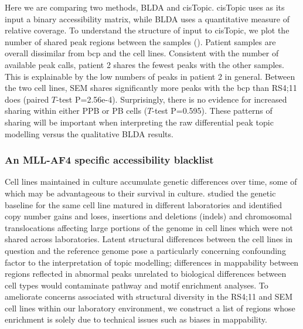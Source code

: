 Here we are comparing two methods, BLDA and cisTopic. cisTopic uses as its input a binary accessibility matrix, while BLDA uses a quantitative measure of relative coverage. To understand the structure of input to cisTopic, we plot the number of shared peak regions between the samples (). Patient samples are overall dissimilar from \gls{bcp} and the cell lines. Consistent with the number of available peak calls, patient 2 shares the fewest peaks with the other samples. This is explainable by the low numbers of peaks in patient 2 in general. Between the two cell lines, SEM shares significantly more peaks with the \gls{bcp} than RS4;11 does (paired $T$-test P=2.56e-4). Surprisingly, there is no evidence for increased sharing within either PPB or PB cells ($T$-test P=0.595). These patterns of sharing will be important when interpreting the raw differential peak topic modelling versus the qualitative BLDA results.

\subsubsection{An MLL-AF4 specific accessibility blacklist}

Cell lines maintained in culture accumulate genetic differences over time, some of which may be advantageous to their survival in culture. \cite{Liu2019}\textcite{Ben-David2018} studied the genetic baseline for the same cell line matured in different laboratories and identified copy number gains and loses, insertions and deletions (indels) and chromosomal translocations affecting large portions of the genome in cell lines which were not shared across laboratories. Latent structural differences between the cell lines in question and the reference genome pose a particularly concerning confounding factor to the interpretation of topic modelling; differences in mappability between regions reflected in abnormal peaks unrelated to biological differences between cell types would contaminate pathway and motif enrichment analyses. To ameliorate concerns associated with structural diversity in the RS4;11 and SEM cell lines within our laboratory environment, we construct a list of regions whose enrichment is solely due to technical issues such as biases in mappability.

